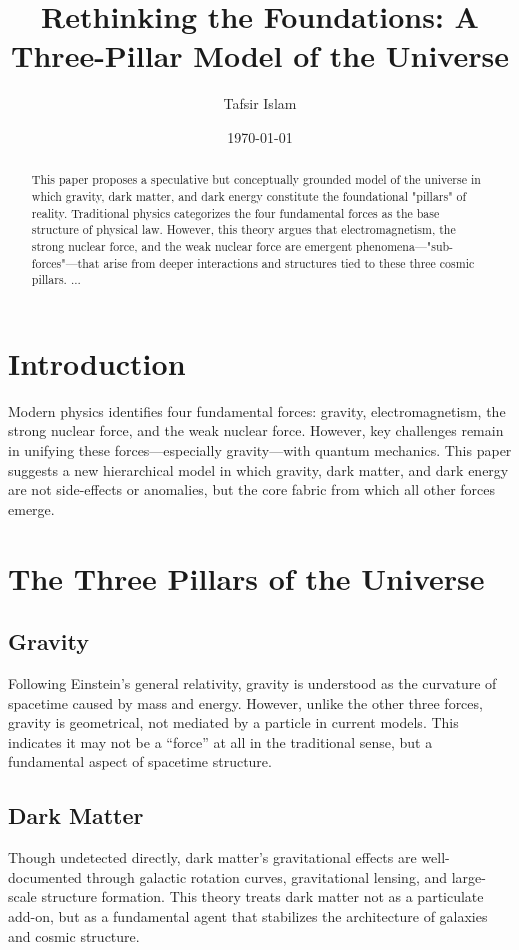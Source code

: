 \documentclass[aps,prd,twocolumn,superscriptaddress,nofootinbib]{revtex4-2}
\begin{document}
\title{Rethinking the Foundations: A Three-Pillar Model of the Universe}
\author{Tafsir Islam}
\date{\today}

\begin{abstract}
This paper proposes a speculative but conceptually grounded model of the universe in which gravity, dark matter, and dark energy constitute the foundational "pillars" of reality. Traditional physics categorizes the four fundamental forces as the base structure of physical law. However, this theory argues that electromagnetism, the strong nuclear force, and the weak nuclear force are emergent phenomena---"sub-forces"---that arise from deeper interactions and structures tied to these three cosmic pillars. ...
\end{abstract}

\maketitle

\section{Introduction}
Modern physics identifies four fundamental forces: gravity, electromagnetism, the strong nuclear force, and the weak nuclear force. However, key challenges remain in unifying these forces---especially gravity---with quantum mechanics. This paper suggests a new hierarchical model in which gravity, dark matter, and dark energy are not side-effects or anomalies, but the core fabric from which all other forces emerge.

\section{The Three Pillars of the Universe}

\subsection{Gravity}
Following Einstein's general relativity, gravity is understood as the curvature of spacetime caused by mass and energy. However, unlike the other three forces, gravity is geometrical, not mediated by a particle in current models. This indicates it may not be a ``force'' at all in the traditional sense, but a fundamental aspect of spacetime structure.

\subsection{Dark Matter}
Though undetected directly, dark matter's gravitational effects are well-documented through galactic rotation curves, gravitational lensing, and large-scale structure formation. This theory treats dark matter not as a particulate add-on, but as a fundamental agent that stabilizes the architecture of galaxies and cosmic structure.
\end{document}
